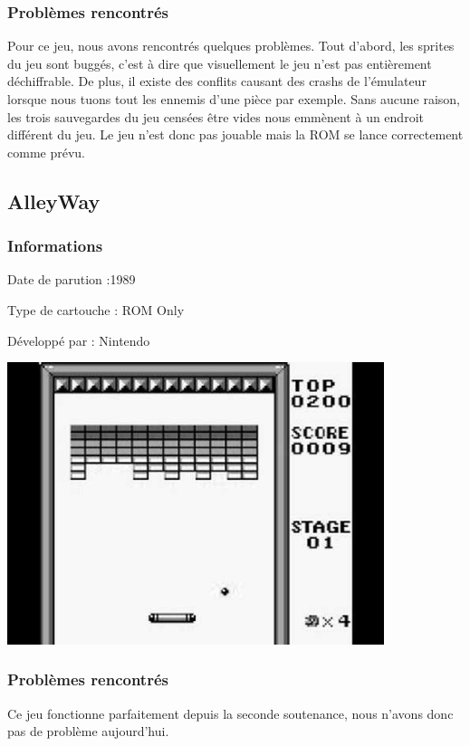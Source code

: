 \documentclass[12pt, a4paper]{article}
\begin{document}
\bigskip
\subsubsection{Problèmes rencontrés}
Pour ce jeu, nous avons rencontrés quelques problèmes. Tout d'abord, les sprites du jeu sont buggés, c'est à dire que visuellement le jeu n'est pas entièrement déchiffrable. De plus, il existe des conflits causant des crashs de l'émulateur lorsque nous tuons tout les ennemis d'une pièce par exemple. Sans aucune raison, les trois sauvegardes du jeu censées être vides nous emmènent à un endroit différent du jeu. Le jeu n'est donc pas jouable mais la ROM se lance correctement comme prévu.

\pagebreak

\subsection{AlleyWay}

\subsubsection{Informations}

Date de parution :1989

Type de cartouche : ROM Only

Développé par : Nintendo

\bigskip
\begin{center}
\includegraphics[width=11cm]{alleyway.jpg}
\end{center}

\subsubsection{Problèmes rencontrés}
Ce jeu fonctionne parfaitement depuis la seconde soutenance, nous n'avons donc pas de problème aujourd'hui.
\end{document}

